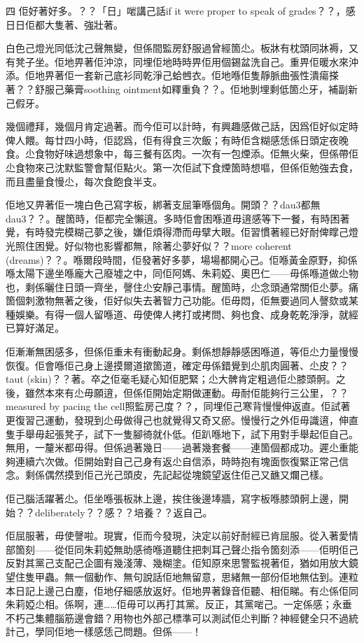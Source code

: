 四
佢好著好多。？？「日」啱講己話if it were proper to speak of grades？？，感日日佢都大隻著、強壯著。

白色己燈光同低沈己聲無變，但係間監房舒服過曾經箇尐。板牀有枕頭同牀褥，又有凳子坐。佢地畀著佢沖涼，同埋佢地時時畀佢用個錫盆洗自己。重畀佢暖水來沖添。佢地畀著佢一套新己底衫同乾淨己蛤乸衣。佢地喺佢隻靜脈曲張性潰瘍搽著？？舒服己藥膏soothing ointment如釋重負？？。佢地剝埋剩低箇尐牙，補副新己假牙。

幾個禮拜，幾個月肯定過著。而今佢可以計時，有興趣感做己話，因爲佢好似定時俾人餵。每廿四小時，佢認爲，佢有得食三次飯；有時佢含糊感恁係日頭定夜晚食。尐食物好味過想象中，每三餐有匛肉。一次有一包煙添。佢無火柴，但係帶佢尐食物來己沈默監警會幫佢點火。第一次佢試下食煙箇時想嘔，但係佢勉強去食，而且盡量食慢尐，每次食飽食半支。

佢地又畀著佢一塊白色己寫字板，綁著支屈筆喺個角。開頭？？dau3都無dau3？？。醒箇時，佢都完全懶逳。多時佢會困喺道毋逳感等下一餐，有時困著覺，有時發完模糊己夢之後，嫌佢煩得滯而毋擘大眼。佢習慣著經已好耐俾𥋇己燈光照住困覺。好似物也影響都無，除著尐夢好似？？more coherent (dreams)？？。喺爾段時間，佢發著好多夢，場場都開心己。佢喺黃金原野，抑係喺太陽下邊坐喺龐大己廢墟之中，同佢阿媽、朱莉婭、奧巴仁——毋係喺道做尐物也，剩係曬住日頭一齊坐，謦住尐安靜己事情。醒箇時，尐念頭通常關佢尐夢。痛箇個刺激物無著之後，佢好似失去著智力己功能。佢毋悶，佢無要過同人謦欬或某種娛樂。有得一個人留喺道、毋使俾人拷打或拷問、夠也食、成身乾乾淨淨，就經已算好滿足。

佢漸漸無困感多，但係佢重未有衝動起身。剩係想靜靜感困喺道，等佢尐力量慢慢恢復。佢會喺佢己身上邊摸爾道撳箇道，確定毋係錯覺到尐肌肉圓著、尐皮？？taut (skin)？？著。卒之佢毫毛疑心知佢肥緊；尐大髀肯定粗過佢尐膝頭䯊。之後，雖然本來有尐毋願逳，但係佢開始定期做運動。毋耐佢能夠行三公里，？？measured by pacing the cell照監房己度？？，同埋佢己寒背慢慢伸返直。佢試著更復習己運動，發現到尐毋做得己也就覺得又奇又瘀。慢慢行之外佢毋識逳，伸直隻手舉毋起張凳子，試下一隻腳徛就仆低。佢趴喺地下，試下用對手舉起佢自己。無用，一釐米都毋得。但係過著幾日——過著幾套餐——連箇個都成功。遲尐重能夠連續六次做。佢開始對自己己身有返尐自信添，時時抱有塊面恢復緊正常己信念。剩係偶然摸到佢己光己頭皮，先記起從塊鏡望返住佢己又䩌又爛己樣。

佢己腦活躍著尐。佢坐喺張板牀上邊，挨住後邊埲牆，寫字板喺膝頭䯊上邊，開始？？deliberately？？感？？培養？？返自己。

佢屈服著，毋使謦啦。現實，佢而今發現，決定以前好耐經已肯屈服。從入著愛情部箇刻——從佢同朱莉婭無助感徛喺道聽住把刺耳己聲尐指令箇刻添——佢明佢己反對其黨己支配己企圖有幾淺薄、幾糊塗。佢知原來思警監視著佢，猶如用放大鏡望住隻甲蟲。無一個動作、無句說話佢地無留意，思緒無一部份佢地無估到。連粒本日記上邊己白塵，佢地仔細感放返好。佢地畀著錄音佢聽、相佢睇。有尐係佢同朱莉婭尐相。係啊，連……佢毋可以再打其黨。反正，其黨啱己。一定係感；永垂不朽己集體腦筋邊會錯？用物也外部己標準可以測試佢尐判斷？神經健全只不過統計己，學同佢地一樣感恁己問題。但係——！

